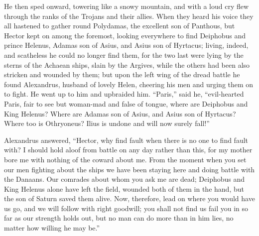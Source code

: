 He then sped onward, towering like a snowy mountain, and with a loud cry
flew through the ranks of the Trojans and their allies. When they heard
his voice they all hastened to gather round Polydamas, the excellent son
of Panthous, but Hector kept on among the foremost, looking everywhere to
find Deiphobus and prince Helenus, Adamas son of Asius, and Asius son of
Hyrtacus; living, indeed, and scatheless he could no longer find them, for
the two last were lying by the sterns of the Achaean ships, slain by the
Argives, while the others had been also stricken and wounded by them; but
upon the left wing of the dread battle he found Alexandrus, husband of
lovely Helen, cheering his men and urging them on to fight. He went up to
him and upbraided him. “Paris,” said he, “evil-hearted Paris, fair to see
but woman-mad and false of tongue, where are Deiphobus and King Helenus?
Where are Adamas son of Asius, and Asius son of Hyrtacus? Where too is
Othryoneus? Ilius is undone and will now surely fall!”

Alexandrus answered, “Hector, why find fault when there is no one to find
fault with? I should hold aloof from battle on any day rather than this,
for my mother bore me with nothing of the coward about me. From the moment
when you set our men fighting about the ships we have been staying here
and doing battle with the Danaans. Our comrades about whom you ask me are
dead; Deiphobus and King Helenus alone have left the field, wounded both
of them in the hand, but the son of Saturn saved them alive. Now,
therefore, lead on where you would have us go, and we will follow with
right goodwill; you shall not find us fail you in so far as our strength
holds out, but no man can do more than in him lies, no matter how willing
he may be.”

